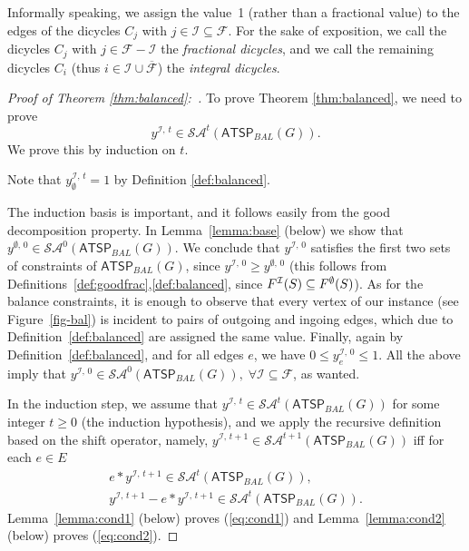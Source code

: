 \documentclass[11pt]{article}
\newcommand{\atspbal}{\homog{\textsf{ATSP$_{\mathit{BAL}}$}}}
\newcommand{\fracset}{\mathcal{F}}
\newcommand{\notfracset}{\overline{\mathcal{F}}}
\newcommand{\sgn}{\mathcal{I}}
\newcommand{\yvec}[2]{y^{#1,\,#2}}	\newcommand{\zvec}[2]{y^{#1,\,#2}}	\newcommand{\zveconly}{y}
\newcommand{\saop}{\mathcal{SA}}
\newcommand{\homog}[1]{{#1}}
\begin{document}
Informally speaking, we assign the value~1
(rather than a fractional value) to the edges of
the dicycles $C_j$ with $j\in\sgn\subseteq\fracset$.
For the sake of exposition,
we call the dicycles $C_j$ with $j\in\fracset-\sgn$
the \emph{fractional dicycles}, and
we call the remaining dicycles $C_i$
(thus $i\in\sgn\cup\notfracset$) the \emph{integral dicycles}.

\begin{proof}[Proof of Theorem \ref{thm:balanced}:~]
To prove Theorem \ref{thm:balanced}, we need to prove
$$\yvec{\sgn}{t} \in \saop^{t}(\homog{\atspbal(G)}).$$
We prove this by induction on $t$.

Note that $\yvec{\sgn}{t}_\emptyset =1$ by Definition \ref{def:balanced}.

The induction basis is important, and it follows easily from the
good decomposition property.
In Lemma~\ref{lemma:base} (below) we show that
$\yvec{\emptyset}{0} \in \saop^0(\homog{\atspbal(G)})$. 
We conclude that $\yvec{\sgn}{0}$ satisfies the first two sets of constraints of 
$\atspbal(G)$, since $\yvec{\sgn}{0} \geq \yvec{\emptyset}{0}$
(this follows from Definitions~\ref{def:goodfrac},\ref{def:balanced}, since
$\goodfrac{\sgn}{S} \subseteq \goodfrac{\emptyset}{S}$). As for the balance constraints, it is enough to observe that every vertex of our instance (see Figure~\ref{fig-bal}) is incident to pairs of outgoing and ingoing edges, which due to Definition~\ref{def:balanced} are assigned the same value. Finally, again by Definition~\ref{def:balanced}, and for all edges $e$, we have $0\leq \yvec{\sgn}{0}_e \leq 1$. All the above imply that $\yvec{\sgn}{0} \in \saop^0(\homog{\atspbal(G)}),\;\forall \sgn\subseteq\fracset$, as wanted. 

In the induction step, we assume that
$\yvec{\sgn}{t} \in \saop^t(\homog{\atspbal(G)})$ for some integer $t\ge0$
(the induction hypothesis),
and we apply the recursive definition based
on the shift operator,
namely,
$\yvec{\sgn}{t+1} \in \saop^{t+1}(\homog{\atspbal(G)})$ iff for each $e\in E$
\begin{align}
	e * \yvec{\sgn}{t+1} \in \saop^t(\homog{\atspbal(G)}),
	\label{eq:cond1} \\
	\yvec{\sgn}{t+1} - e*\yvec{\sgn}{t+1} \in
	\saop^t(\homog{\atspbal(G)}).  \label{eq:cond2}
\end{align}
Lemma~\ref{lemma:cond1} (below) proves (\ref{eq:cond1}) and
Lemma~\ref{lemma:cond2} (below) proves (\ref{eq:cond2}).
\end{proof}
\end{document}

